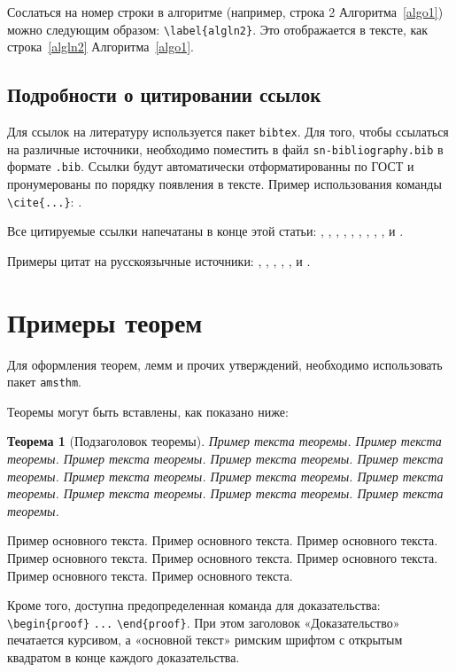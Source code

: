 \documentclass[pdflatex,sn-mathphys-gost]{pmi-jnl}
\newtheorem{theorem}{Теорема}%
\begin{document}
Сослаться на номер строки в алгоритме (например, строка 2 Алгоритма~\ref{algo1}) можно следующим образом: \verb+\label{algln2}+. Это отображается в тексте, как строка~\ref{algln2} Алгоритма~\ref{algo1}.

\subsection{Подробности о цитировании ссылок}\label{subsec7}

Для ссылок на литературу используется пакет \verb+bibtex+. Для того, чтобы ссылаться на различные источники, необходимо поместить в файл \verb+sn-bibliography.bib+ в формате \verb+.bib+. Ссылки будут автоматически отформатированны по ГОСТ и пронумерованы по порядку появления в тексте. Пример использования команды \verb+\cite{...}+: \cite{bib1}.

Все цитируемые ссылки напечатаны в конце этой статьи: \cite{bib3}, \cite{bib4}, \cite{bib5}, \cite{bib6}, \cite{bib7}, \cite{bib8}, \cite{bib9}, \cite{bib10}, \cite{bib11}, и \cite{bib13}.

Примеры цитат на русскоязычные источники: \cite{bibru01}, \cite{bibru02}, \cite{bibru03}, \cite{bibru04}, \cite{bibru05}, и \cite{bibru06}.


\section{Примеры теорем}\label{sec10}

Для оформления теорем, лемм и прочих утверждений, необходимо использовать пакет \verb+amsthm+. 

Теоремы могут быть вставлены, как показано ниже:

\begin{theorem}[Подзаголовок теоремы]\label{thm1}
Пример текста теоремы. Пример текста теоремы. Пример текста теоремы. Пример текста теоремы. Пример текста теоремы.
Пример текста теоремы. Пример текста теоремы. Пример текста теоремы. Пример текста теоремы. Пример текста теоремы.
Пример текста теоремы.
\end{theorem}

Пример основного текста. Пример основного текста. Пример основного текста. Пример основного текста. Пример основного текста. Пример основного текста. Пример основного текста. Пример основного текста.

Кроме того, доступна предопределенная команда для доказательства: \verb+\begin{proof}+ \verb+...+ \verb+\end{proof}+. При этом заголовок «Доказательство» печатается курсивом, а «основной текст» римским шрифтом с открытым квадратом в конце каждого доказательства.
\end{document}
